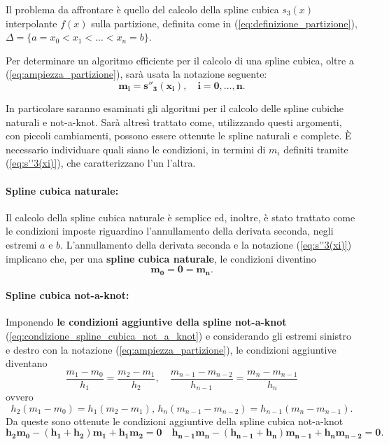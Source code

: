 Il problema da affrontare è quello del calcolo della spline cubica $s_3(x)$ interpolante $f(x)$ sulla partizione, definita come in (\ref{eq:definizione_partizione}), $\Delta=\{a=x_0<x_1<\hdots<x_n=b\}$.

Per determinare un algoritmo efficiente per il calcolo di una spline cubica, oltre a (\ref{eq:ampiezza_partizione}), sarà usata la notazione seguente:
\begin{equation}\label{eq:s''3(xi)}
    \boldsymbol{m_i=s''_3(x_i),\quad i=0,\hdots,n.}
\end{equation}

In particolare saranno esaminati gli algoritmi per il calcolo delle spline cubiche naturali e not-a-knot. Sarà altresì trattato come, utilizzando questi argomenti, con piccoli cambiamenti, possono essere ottenute le spline naturali e complete. È necessario individuare quali siano le condizioni, in termini di $m_i$ definiti tramite (\ref{eq:s''3(xi)}), che caratterizzano l'un l'altra.

\paragraph{Spline cubica naturale:}
Il calcolo della spline cubica naturale è semplice ed, inoltre, è stato trattato come le condizioni imposte riguardino l'annullamento della derivata seconda, negli estremi $a$ e $b$. L'annullamento della derivata seconda e la notazione (\ref{eq:s''3(xi)}) implicano che, per una \textbf{spline cubica naturale}, le condizioni diventino
\begin{equation}\label{eq:condizione_spline_naturale}
    \boldsymbol{m_0=0=m_n}.
\end{equation}

\paragraph{Spline cubica not-a-knot:} Imponendo  \textbf{le condizioni aggiuntive della spline not-a-knot} (\ref{eq:condizione_spline_cubica_not_a_knot}) e considerando gli estremi sinistro e destro con la notazione (\ref{eq:ampiezza_partizione}), le condizioni aggiuntive diventano
\begin{equation*}
    \frac{m_1-m_0}{h_1}=\frac{m_2-m_1}{h_2},\quad \frac{m_{n-1}-m_{n-2}}{h_{n-1}}=\frac{m_n-m_{n-1}}{h_n}
\end{equation*}
ovvero
\begin{equation*}
	h_2(m_1-m_0)=h_1(m_2-m_1),\, h_{n}(m_{n-1}-m_{n-2})=h_{n-1}(m_{n}-m_{n-1}).
\end{equation*}
Da queste sono ottenute le condizioni aggiuntive della spline cubica not-a-knot
\begin{equation}\label{eq:condizione_spline_cubica_not_a_knot2}
    \boldsymbol{h_2m_0-(h_1+h_2)m_1+h_1m_2=0}\quad\boldsymbol{h_{n-1}m_n-(h_{n-1}+h_n)m_{n-1}+h_nm_{n-2}=0}.
\end{equation}

